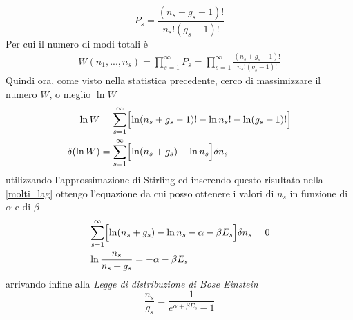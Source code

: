 \begin{equation}
P_s = \frac{ (n_s + g_s - 1)!}{n_s! (g_s - 1)! }
\end{equation}
Per cui il numero di modi totali è
\begin{equation}
\begin{split}
W(n_1, ..., n_s) = \prod_{s=1}^{ \infty } P_s = \prod_{s=1}^{ \infty } \frac{ (n_s + g_s - 1)!}{n_s! (g_s - 1)! }
\end{split}
\end{equation}
Quindi ora, come visto nella statistica precedente, cerco di massimizzare il numero $W$, o meglio $\ln W$
\begin{equation}
\begin{split}
\ln W & = \sum_{s=1}^{\infty} \Bigl[ \ln ( n_s + g_s - 1 )! - \ln n_s ! - \ln (g_s - 1)! \Bigr] \\
\delta (\ln W) & = \sum_{s=1}^{\infty} \Bigl[ \ln(n_s + g_s) - \ln n_s \Bigr] \delta n_s
\end{split}
\end{equation}
utilizzando l'approssimazione di Stirling ed inserendo questo risultato nella \ref{molti_lag} ottengo l'equazione 
da cui posso ottenere i valori di $n_s$ in funzione di $\alpha$ e di $\beta$
\begin{equation}
\begin{split}
& \sum_{s=1}^{\infty} \Bigl[ \ln(n_s + g_s) - \ln n_s - \alpha -\beta E_s\Bigr] \delta n_s = 0 \\
& \ln \frac{ n_s}{n_s + g_s } = -\alpha - \beta E_s
\end{split}
\end{equation}
arrivando infine alla \textit{Legge di distribuzione di Bose Einstein}
\begin{equation}
\frac{ n_s}{g_s } = \frac{ 1}{e^{\alpha +\beta E_s} - 1 }
\end{equation}



